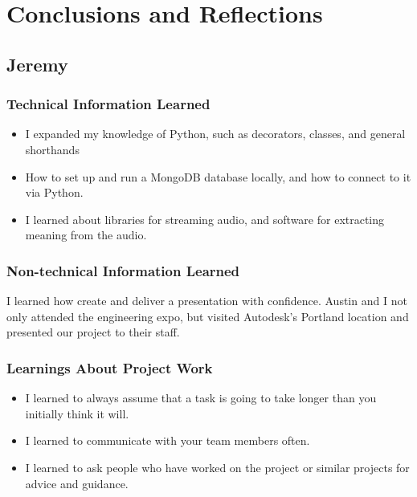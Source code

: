 \documentclass[onecolumn, draftclsnofoot,10pt, compsoc]{IEEEtran}
\begin{document}
\section{Conclusions and Reflections}


\subsection{Jeremy}
	\subsubsection{Technical Information Learned}
			\begin{itemize}
				\item I expanded my knowledge of Python, such as decorators, classes, and general shorthands
				\item How to set up and run a MongoDB database locally, and how to connect to it via  Python.
				\item I learned about libraries for streaming audio, and software for extracting meaning from the audio.
			\end{itemize}




	\subsubsection{Non-technical Information Learned}
		I learned how create and deliver a presentation with confidence. Austin and I not only attended the engineering expo, but visited Autodesk's Portland location and presented our project to their staff.




	\subsubsection{Learnings About Project Work}
		\begin{itemize}
			\item I learned to always assume that a task is going to take longer than you initially think it will.
			\item I learned to communicate with your team members often.
			\item I learned to ask people who have worked on the project or similar projects for advice and guidance.
		\end{itemize}
\end{document}
